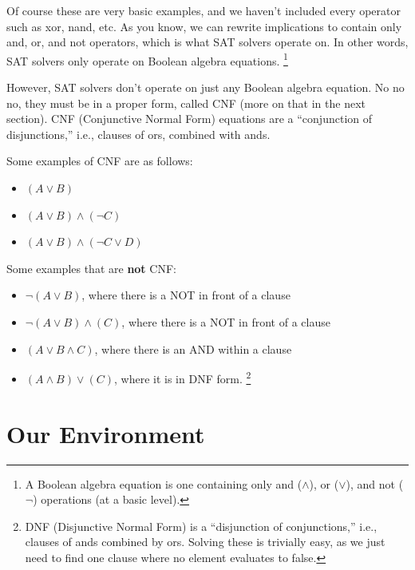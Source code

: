 \documentclass[oneside]{book}
\begin{document}
Of course these are very basic examples, and we haven't included every operator such as xor, 
nand, etc. As you know, we can rewrite implications to contain only and, or, and not operators,
which is what SAT solvers operate on. In other words, SAT solvers only operate on Boolean algebra equations.
\footnote{A Boolean algebra equation is one containing only and ($\land$), or ($\lor$), 
and not ($\neg$) operations (at a basic level).}

However, SAT solvers don't operate on just any Boolean algebra equation. No no no, they must be in a 
proper form, called CNF (more on that in the next section). CNF (Conjunctive Normal Form) equations are a 
``conjunction of disjunctions,'' i.e., clauses of ors, combined with ands.

Some examples of CNF are as follows:

\begin{itemize}
    \item $(A \lor B)$
    \item $(A \lor B) \land (\neg C)$
    \item $(A \lor B) \land (\neg C \lor D)$
\end{itemize}

Some examples that are \textbf{not} CNF:

\begin{itemize}
    \item $\neg(A \lor B)$, where there is a NOT in front of a clause
    \item $\neg(A \lor B) \land (C)$, where there is a NOT in front of a clause
    \item $(A \lor B \land C)$, where there is an AND within a clause
    \item $(A \land B) \lor (C)$, where it is in DNF form.
    \footnote{DNF (Disjunctive Normal Form) is a ``disjunction of conjunctions,'' 
    i.e., clauses of ands combined by ors. Solving these is trivially easy, 
    as we just need to find one clause where no element evaluates to false.}
\end{itemize}

\section{Our Environment}
\end{document}
